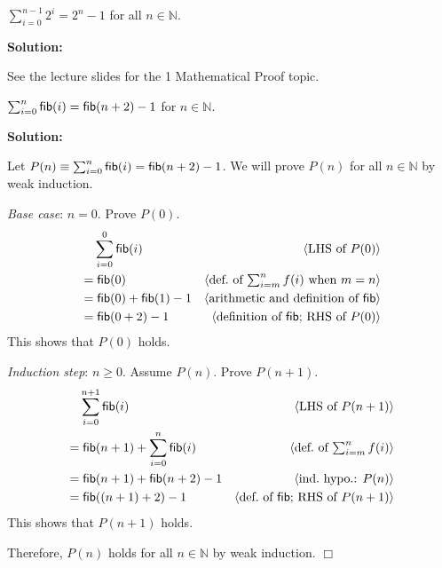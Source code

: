 \documentclass[11pt,fleqn]{article}
\newcommand{\sglsp}{\ }
\newcommand{\mname}[1]{\mbox{\sf #1}}
\newenvironment{proof}{\par\noindent{\bf Proof\sglsp}}{\hfill$\Box$}
\newcommand{\pnote}[1]{{\langle \text{#1} \rangle}}
\begin{document}
\medskip

    \item $\sum^{n-1}_{i=0}2^i = 2^n - 1$ for all $n \in \mathbb{N}$.

\medskip

\textbf{Solution:}

\medskip

See the lecture slides for the 1 Mathematical Proof topic.

\medskip

    \item $\sum^{n}_{i=0} \mname{fib}(i) = \mname{fib}(n+2) - 1$ for
      $n \in \mathbb{N}$.

\medskip

\textbf{Solution:}

\medskip

\begin{proof}
Let $P(n) \equiv \sum^{n}_{i=0} \mname{fib}(i) = \mname{fib}(n+2) -
1$.  We will prove $P(n)$ for all $n \in \mathbb{N}$ by weak
induction.

\medskip

\emph{Base case}: $n = 0$. Prove $P(0)$.
\begin{align*}
  &\phantom{{}=} \sum^{0}_{i=0}\mname{fib}(i) & \pnote{LHS of $P(0)$}\\
  &= \mname{fib}(0) & \pnote{def.\ of $\textstyle{\sum}^{n}_{i=m}\,f(i)$ when $m=n$}\\
  &= \mname{fib}(0) + \mname{fib}(1) - 1 & \pnote{arithmetic and definition of \mname{fib}}\\
  &= \mname{fib}(0 + 2) - 1 & \pnote{definition of \mname{fib}; RHS of $P(0)$}
\end{align*}
This shows that $P(0)$ holds.

\medskip

\emph{Induction step}: $n \ge 0$.  Assume $P(n)$. Prove $P(n + 1)$.
\begin{align*}
  &\phantom{{}=} \sum^{n+1}_{i=0}\mname{fib}(i) & \pnote{LHS of $P(n + 1)$}\\
  &= \mname{fib}(n + 1) + \sum^{n}_{i=0}\mname{fib}(i)
    & \pnote{def.\  of $\textstyle{\sum}^{n}_{i=m}\,f(i)$}\\
  &= \mname{fib}(n + 1) + \mname{fib}(n + 2) - 1
    & \pnote{ind.\ hypo.: $P(n)$}\\
  &= \mname{fib}((n + 1) + 2) - 1
    & \pnote{def.\ of \mname{fib}; RHS of $P(n + 1)$}
\end{align*}
This shows that $P(n + 1)$ holds.

\medskip

Therefore, $P(n)$ holds for all $n \in \mathbb{N}$ by weak induction.
\end{proof}
\end{document}
